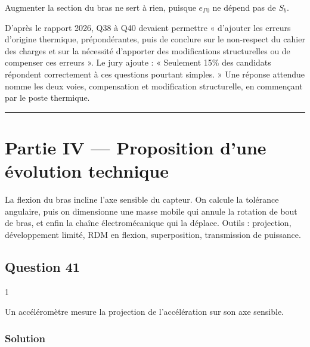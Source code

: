 \documentclass[11pt,a4paper]{article}
\begin{document}
Augmenter la section du bras ne sert à rien, puisque \(e_{\Gamma0}\) ne dépend pas de \(S_b\).

\begin{jury}

D'après le rapport 2026, Q38 à Q40 devaient permettre « d'ajouter les erreurs d'origine thermique, prépondérantes, puis de conclure sur le non-respect du cahier des charges et sur la nécessité d'apporter des modifications structurelles ou de compenser ces erreurs ». Le jury ajoute : « Seulement 15\% des candidats répondent correctement à ces questions pourtant simples. » Une réponse attendue nomme les deux voies, compensation et modification structurelle, en commençant par le poste thermique.

\end{jury}

\begin{center}\rule{0.5\linewidth}{0.5pt}\end{center}

\hypertarget{partie-iv-proposition-dune-uxe9volution-technique}{%
\section{Partie IV --- Proposition d'une évolution technique}\label{partie-iv-proposition-dune-uxe9volution-technique}}

La flexion du bras incline l'axe sensible du capteur. On calcule la tolérance angulaire, puis on dimensionne une masse mobile qui annule la rotation de bout de bras, et enfin la chaîne électromécanique qui la déplace. Outils : projection, développement limité, RDM en flexion, superposition, transmission de puissance.

\hypertarget{question-41}{%
\subsection{Question 41}\label{question-41}}

\begin{indication}{1}

Un accéléromètre mesure la projection de l'accélération sur son axe sensible.

\end{indication}

\hypertarget{solution-40}{%
\subsubsection{Solution}\label{solution-40}}
\end{document}

